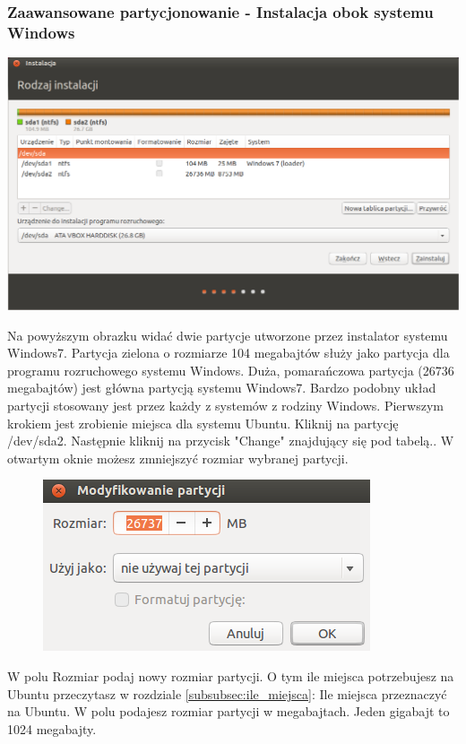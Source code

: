 \subsubsection{Zaawansowane partycjonowanie - Instalacja obok systemu Windows}
\begin{center}
        \includegraphics[scale=0.5]{images/instalator_partycjonowanie_gparted2_czysty.png}
\end{center}
Na powyższym obrazku widać dwie partycje utworzone przez instalator systemu Windows7. Partycja zielona o rozmiarze 104 megabajtów służy jako partycja dla programu rozruchowego systemu Windows. Duża, pomarańczowa partycja (26736 megabajtów) jest główna partycją systemu Windows7. Bardzo podobny układ partycji stosowany jest przez każdy z systemów z rodziny Windows.
Pierwszym krokiem jest zrobienie miejsca dla systemu Ubuntu. Kliknij na partycję /dev/sda2. Następnie kliknij na przycisk "Change" znajdujący się pod tabelą.. W otwartym oknie możesz zmniejszyć rozmiar wybranej partycji.
\clearpage
\begin{figure}
                \includegraphics[scale=1]{images/instalator_partycjonowanie_gparted_zmniejszenie_partycji_windows.png}
\end{figure}
W polu Rozmiar podaj nowy rozmiar partycji. O tym ile miejsca potrzebujesz na Ubuntu przeczytasz w rozdziale \ref{subsubsec:ile_miejsca}: Ile miejsca przeznaczyć na Ubuntu. W polu podajesz rozmiar partycji w megabajtach. Jeden gigabajt to 1024 megabajty.\\

